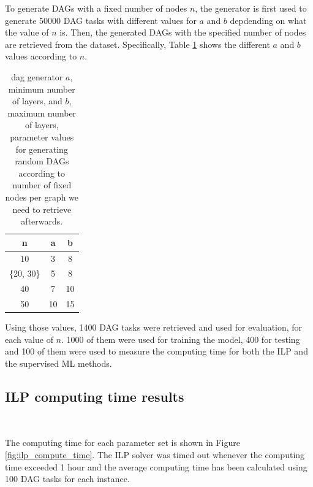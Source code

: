 To generate DAGs with a fixed number of nodes $n$, 
the generator is first used to generate 50000 DAG tasks
with different values for $a$ and $b$ depdending on what 
the value of $n$ is. Then, the generated DAGs with 
the specified number of nodes are retrieved from the dataset.
Specifically, Table \ref{tab:layer_num_minmax} 
shows the different $a$ and $b$ values according to $n$.

\begin{table}
    \centering
    \begin{tabular}{|c|c|c|}    
        \hline
        \textbf{n} & \textbf{a} & \textbf{b} \\
        \hline
        10 & 3 & 8 \\
        \hline
        \{20, 30\} & 5 & 8 \\
        \hline
        40 & 7 & 10 \\
        \hline
        50 & 10 & 15 \\
        \hline
    \end{tabular}
    \caption{dag generator $a$, minimum number of layers, and $b$, maximum
    number of layers, parameter values for generating 
    random DAGs according to number of fixed nodes per graph we need to retrieve afterwards.}
    \label{tab:layer_num_minmax}
\end{table}

Using those values, 1400 DAG tasks were retrieved and used for 
evaluation, for each value of $n$.
1000 of them were used for training the model, 400 for testing
and 100 of them were used to measure the computing time 
for both the ILP and the supervised ML methods.


\subsection{ILP computing time results}
~

The computing time for each parameter set is shown 
in Figure \ref{fig:ilp_compute_time}.
The ILP solver was timed out whenever the computing time exceeded 1 hour
and the average computing time has been calculated using 100 DAG tasks for each instance.

